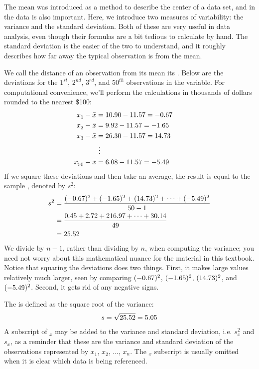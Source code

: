 The mean was introduced as a method to describe the center of a data set, and  in the data is also important. Here, we introduce two measures of variability: the variance and the standard deviation. Both of these are very useful in data analysis, even though their formulas are a bit tedious to calculate by hand. The standard deviation is the easier of the two to understand, and it roughly describes how far away the typical observation is from the mean.

We call the distance of an observation from its mean its . Below are the deviations for the $1^{st}_{}$, $2^{nd}_{}$, $3^{rd}$, and $50^{th}_{}$ observations in the  variable.
For computational convenience, we'll perform the calculations
in thousands of dollars rounded to the nearest \$100:
\begin{align*}
x_1^{}-\bar{x} &= 10.90 - 11.57{} = -0.67 \hspace{5mm}\text{ } \\
x_2^{}-\bar{x} &= 9.92 - 11.57{} = -1.65 \\
x_3^{}-\bar{x} &= 26.30 - 11.57{} = 14.73 \\
			&\ \vdots \\
x_{50}^{}-\bar{x} &= 6.08 - 11.57{} = -5.49
\end{align*}
If we square these deviations and then take an average,
the result is equal to the sample
\label{varianceIsDefined},
denoted by $s_{}^2$:
\begin{align*}
s_{}^2 &= \frac{(-0.67)_{}^2 + (-1.65)_{}^2 + (14.73)_{}^2 + \cdots + (-5.49)_{}^2}{50{}-1} \\
	&= \frac{0.45 + 2.72 + 216.97 + \cdots + 30.14}{49} \\
	&= 25.52{}
\end{align*}
We divide by $n - 1$, rather than dividing by $n$,
when computing the variance;
you need not worry about this mathematical nuance
for the material in this textbook.
Notice that squaring the deviations does two things.
First, it makes large values relatively much larger,
seen by comparing $(-0.67)^2$, $(-1.65)^2$, $(14.73)^2$,
and $(-5.49)^2$.
Second, it gets rid of any negative signs.

The  is defined as the square root of the variance:
\begin{align*}
s = \sqrt{25.52{}} = 5.05{}
\end{align*}
A subscript of $_x$ may be added to the variance
and standard deviation,
i.e. $s_x^2$ and $s_x^{}$, as a reminder that these
are the variance and standard deviation of the observations
represented by $x_1^{}$, $x_2^{}$, ..., $x_n^{}$.
The $_{x}$ subscript is usually omitted when it is clear
which data is being referenced.

